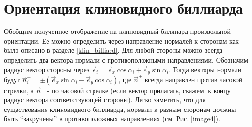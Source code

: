 \documentclass[a4paper]{article}
\begin{document}
%
%
%

\section{Ориентация клиновидного биллиарда}

Обобщим полученное отображение на клиновидный биллиард произвольной ориентации. Ее можно определить через направление нормалей к сторонам как было описано в разделе \ref{klin_billiard}. Для любой стороны можно всегда определить два вектора нормали с противоположными направлениями. Обозначим радиус вектор стороны через $\vec{e}_{i} = \vec{e}_{x}\cos \alpha_i +\vec{e}_{y} \sin\alpha_i $. Тогда векторы нормали будут $\overset{\rightharpoonup }{n}_i^{\pm } = \pm(\vec{e}_{x}\sin \alpha_i -\vec{e}_{y} \cos\alpha_i)$, где $\vec{n}^+$ всегда направлен против часовой стрелки, а $\vec{n}^-$ - по часовой стрелке (если вектор прилагать, скажем, к концу радиус вектора соответствующей стороны). Легко заметить, что для существования клиновидного биллиарда, нормали к разным сторонам должны быть ``закручены'' в противоположных направлениях (см. Рис. \ref{image4}).
\end{document}
